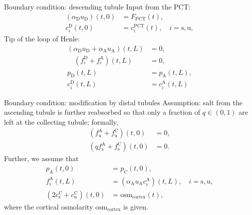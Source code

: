 \documentclass{beamer}
\begin{document}
\begin{frame}{Boundary condition: descending tubule}
    Input from the PCT:
    \begin{align}
        (\alpha_\mathrm{D} u_\mathrm{D})(t,0) &= F_\mathrm{PCT}(t),\\
        c_i^\mathrm{D}(t,0) &= c_{i}^{\mathrm{PCT}}(t),\quad i=\mathrm{s,u},
    \end{align}
    Tip of the loop of Henle:
    \begin{align}
        (\alpha_\mathrm{D}u_\mathrm{D}+\alpha_\mathrm{A}u_\mathrm{A})(t,L) &= 0,\\
        \quad\left( f_i^\mathrm{D}+f_i^\mathrm{A} \right)(t,L) &= 0,\\
        p_\mathrm{D}(t,L)&= p_{\mathrm{A}}(t,L),\\ 
        c_i^\mathrm{D}(t,L) &=c_i^\mathrm{A}(t,L)
    \end{align}
\end{frame}

\begin{frame}{Boundary condition: modification by distal tubules}
    Assumption: salt from the ascending tubule is further reabsorbed so that only a fraction of $q\in (0,1)$ are left at the collecting tubule; formally,
    \begin{align}
        \left( f_{\mathrm{u}}^\mathrm{A}+f_\mathrm{u}^\mathrm{C} \right)(t,0) &= 0,\\
        \left( qf_{\mathrm{s}}^\mathrm{A}+f_\mathrm{s}^\mathrm{C} \right)(t,0) &= 0.
    \end{align}
    Further, we assume that 
    \begin{align}
        p_\mathrm{A}(t,0)&= p_{\mathrm{C}}(t,0),\\ 
        f_i^\mathrm{A}(t,L) &= (\alpha_\mathrm{A}  u_\mathrm{A}  c_i^\mathrm{A})(t,L),\quad i = \mathrm{s},\mathrm{u},\\ 
        (2c_\mathrm{s}^\mathrm{C}+c_\mathrm{u}^\mathrm{C})(t,0) &=\mathrm{osm}_\mathrm{cortex}(t),
    \end{align}
        where the cortical osmolarity $\mathrm{osm}_\mathrm{cortex}$ is given.
\end{frame}
\end{document}
